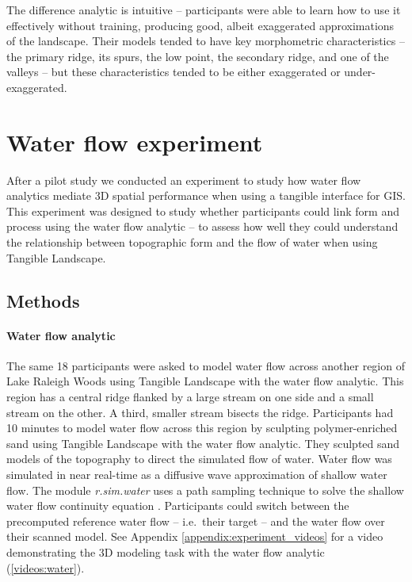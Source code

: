 \documentclass[prodmode,acmtochi]{acmsmall} %
\begin{document}
The difference analytic is intuitive -- 
participants were able to learn how to use it effectively without training, 
producing good, albeit exaggerated approximations of the landscape. 
%
Their models tended to have key morphometric characteristics -- 
the primary ridge, its spurs, the low point, 
the secondary ridge, and one of the valleys -- 
but these characteristics tended to be 
either exaggerated or under-exaggerated.

\section{Water flow experiment}
After a pilot study \cite{Harmon2016}
we conducted an experiment to study 
how water flow analytics 
mediate 3D spatial performance
when using a tangible interface for GIS.
%
This experiment was designed to study whether
participants could link form and process
using the water flow analytic -- to assess
how well they could understand the relationship 
between topographic form 
and the flow of water 
when using Tangible Landscape.

\subsection{Methods}
\paragraph{Water flow analytic}
The same 18 participants were asked to model water flow 
across another region of Lake Raleigh Woods
using Tangible Landscape with the water flow analytic.
This region has a central ridge 
flanked by a large stream on one side 
and a small stream on the other.  
A third, smaller stream bisects the ridge.
Participants had 10 minutes to model water flow across this region
by sculpting polymer-enriched sand using Tangible Landscape 
with the water flow analytic. 
They sculpted sand models of the topography
to direct the simulated flow of water.  
Water flow was simulated in near real-time 
as a diffusive wave approximation of shallow water flow.
The module \textit{r.sim.water} \cite{r.sim.water}
uses a path sampling technique to solve the shallow water flow continuity equation \cite{Mitasova2004}.
Participants could switch between the precomputed reference water flow 
-- i.e.~their target -- 
and the water flow over their scanned model.
%
See Appendix \ref{appendix:experiment_videos}
for a video demonstrating the 3D modeling task with the water flow analytic (\ref{videos:water}).
\end{document}
